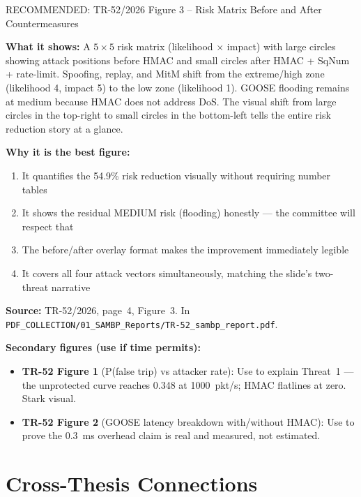 \documentclass[12pt,a4paper]{article}
\begin{document}
\begin{resultbox}{RECOMMENDED: TR-52/2026 Figure 3 -- Risk Matrix Before and After Countermeasures}

\textbf{What it shows:} A $5\times5$ risk matrix (likelihood $\times$ impact) with large circles showing attack positions before HMAC and small circles after HMAC + SqNum + rate-limit. Spoofing, replay, and MitM shift from the extreme/high zone (likelihood 4, impact 5) to the low zone (likelihood 1). GOOSE flooding remains at medium because HMAC does not address DoS. The visual shift from large circles in the top-right to small circles in the bottom-left tells the entire risk reduction story at a glance.

\textbf{Why it is the best figure:}
\begin{enumerate}[nosep]
  \item It quantifies the 54.9\% risk reduction visually without requiring number tables
  \item It shows the residual MEDIUM risk (flooding) honestly --- the committee will respect that
  \item The before/after overlay format makes the improvement immediately legible
  \item It covers all four attack vectors simultaneously, matching the slide's two-threat narrative
\end{enumerate}

\textbf{Source:} TR-52/2026, page~4, Figure~3. In \texttt{PDF\_COLLECTION/01\_SAMBP\_Reports/TR-52\_sambp\_report.pdf}.
\end{resultbox}

\textbf{Secondary figures (use if time permits):}
\begin{itemize}[nosep]
  \item \textbf{TR-52 Figure 1} (P(false trip) vs attacker rate): Use to explain Threat~1 — the unprotected curve reaches 0.348 at 1000~pkt/s; HMAC flatlines at zero. Stark visual.
  \item \textbf{TR-52 Figure 2} (GOOSE latency breakdown with/without HMAC): Use to prove the 0.3~ms overhead claim is real and measured, not estimated.
\end{itemize}

\section{Cross-Thesis Connections}
\end{document}
